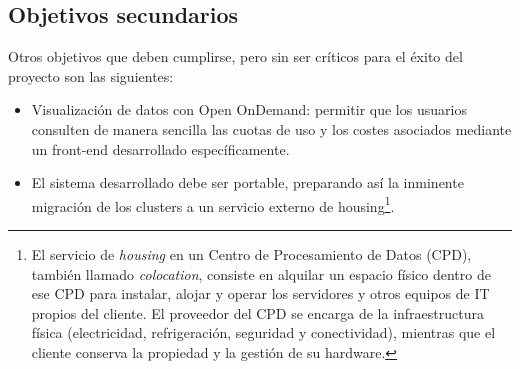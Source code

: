 \subsection{Objetivos secundarios}
Otros objetivos que deben cumplirse, pero sin ser críticos para el éxito del proyecto son las siguientes:
\begin{itemize}
    \item Visualización de datos con Open OnDemand: permitir que los usuarios consulten de manera sencilla 
    las cuotas de uso y los costes asociados mediante un front-end desarrollado específicamente.
    \item El sistema desarrollado debe ser portable, preparando así la inminente migración de los clusters a un servicio externo de housing\footnote{El servicio
    de \textit{housing} en un Centro de Procesamiento de Datos (CPD), también llamado \textit{colocation}, 
    consiste en alquilar un espacio físico dentro de ese CPD para instalar, alojar y operar los servidores y otros equipos de IT propios 
    del cliente. El proveedor del CPD se encarga de la infraestructura física (electricidad, refrigeración, seguridad y conectividad), 
    mientras que el cliente conserva la propiedad y la gestión de su hardware. }.
\end{itemize}